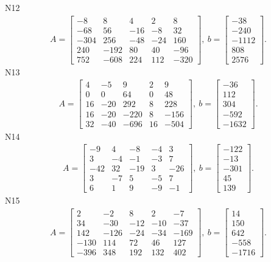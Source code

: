 \documentclass[11pt]{report}
\begin{document}
N12
\begin{align*}
 A = \left[\begin{matrix}-8 & 8 & 4 & 2 & 8\\-68 & 56 & -16 & -8 & 32\\-304 & 256 & -48 & -24 & 160\\240 & -192 & 80 & 40 & -96\\752 & -608 & 224 & 112 & -320\end{matrix}\right],
\ b = \left[\begin{matrix}-38\\-240\\-1112\\808\\2576\end{matrix}\right]. 
 \end{align*}
N13
\begin{align*}
 A = \left[\begin{matrix}4 & -5 & 9 & 2 & 9\\0 & 0 & 64 & 0 & 48\\16 & -20 & 292 & 8 & 228\\16 & -20 & -220 & 8 & -156\\32 & -40 & -696 & 16 & -504\end{matrix}\right],
\ b = \left[\begin{matrix}-36\\112\\304\\-592\\-1632\end{matrix}\right]. 
 \end{align*}
N14
\begin{align*}
 A = \left[\begin{matrix}-9 & 4 & -8 & -4 & 3\\3 & -4 & -1 & -3 & 7\\-42 & 32 & -19 & 3 & -26\\3 & -7 & 5 & -5 & 7\\6 & 1 & 9 & -9 & -1\end{matrix}\right],
\ b = \left[\begin{matrix}-122\\-13\\-301\\45\\139\end{matrix}\right]. 
 \end{align*}
N15
\begin{align*}
 A = \left[\begin{matrix}2 & -2 & 8 & 2 & -7\\34 & -30 & -12 & -10 & -37\\142 & -126 & -24 & -34 & -169\\-130 & 114 & 72 & 46 & 127\\-396 & 348 & 192 & 132 & 402\end{matrix}\right],
\ b = \left[\begin{matrix}14\\150\\642\\-558\\-1716\end{matrix}\right]. 
 \end{align*}
\end{document}
